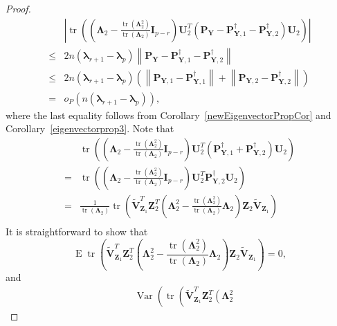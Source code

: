 \documentclass[12pt]{article} %
\DeclareMathOperator{\mytr}{tr}
\DeclareMathOperator{\myE}{E}
\DeclareMathOperator{\myVar}{Var}
\newcommand{\bZ}{\mathbf{Z}}
\newcommand{\bP}{\mathbf{P}}
\newcommand{\bY}{\mathbf{Y}}
\newcommand{\bI}{\mathbf{I}}
\newcommand{\bU}{\mathbf{U}}
\newcommand{\bV}{\mathbf{V}}
\newcommand{\bfsym}[1]{\ensuremath{\boldsymbol{#1}}}
\def\blambda {\bfsym {\lambda}}
\def\bLambda {\bfsym {\Lambda}}
\theoremstyle{definition}
\begin{document}
\begin{appendices}
\begin{proof}
\begin{equation}
           \begin{split}
    &\left|
        \mytr\left(
            \left(\bLambda_2-\frac{\mytr(\bLambda_2^2)}{\mytr(\bLambda_2)}\bI_{p-r}\right) \bU_2^T \left(\bP_{\bY}-\bP_{\bY,1}^\dagger-\bP_{\bY,2}^\dagger\right) \bU_2 
    \right)
    \right|
    \\
    \leq & 2n (\blambda_{r+1} -\blambda_p)\left\|\bP_{\bY}-\bP_{\bY,1}^\dagger-\bP_{\bY,2}^\dagger\right\|
    \\
    \leq & 2n (\blambda_{r+1} -\blambda_p)\left(
        \left\|\bP_{\bY,1}-\bP_{\bY,1}^\dagger\right\|
        +\left\|\bP_{\bY,2}-\bP_{\bY,2}^\dagger
        \right\|
    \right)
    \\
    =&o_P\left(n(\blambda_{r+1}-\blambda_p)\right),
           \end{split}
       \end{equation}
       where the last equality follows from Corollary~\ref{newEigenvectorPropCor} and Corollary~\ref{eigenvectorprop3}.
       Note that
       \begin{equation*}
           \begin{split}
        &
        \mytr\left(
            \left(\bLambda_2-\frac{\mytr(\bLambda_2^2)}{\mytr(\bLambda_2)}\bI_{p-r}\right) \bU_2^T \left(\bP_{\bY,1}^\dagger+\bP_{\bY,2}^\dagger\right) \bU_2 
    \right)
    \\
        =&
        \mytr\left(
            \left(\bLambda_2-\frac{\mytr(\bLambda_2^2)}{\mytr(\bLambda_2)}\bI_{p-r}\right) \bU_2^T \bP_{\bY,2}^\dagger \bU_2 
    \right)
    \\
    =&
    \frac{1}{\mytr(\bLambda_2)} 
    \mytr\left(\tilde{\bV}_{\bZ_1}^T \bZ_2^T 
 \left(
       \bLambda_2^2 
    -\frac{\mytr(\bLambda_2^2)}{\mytr(\bLambda_2)}\bLambda_2
 \right)
\bZ_2 \tilde{\bV}_{\bZ_1}\right)
    \\
           \end{split}
       \end{equation*}
       It is straightforward to show that
       \begin{equation*}
    \myE \mytr\left(\tilde{\bV}_{\bZ_1}^T \bZ_2^T 
 \left(
       \bLambda_2^2 
    -\frac{\mytr(\bLambda_2^2)}{\mytr(\bLambda_2)}\bLambda_2
 \right)
\bZ_2 \tilde{\bV}_{\bZ_1}\right)
=0,
       \end{equation*}
       and
       \begin{equation*}
           \begin{split}
    &\myVar\left(
        \mytr\left(\tilde{\bV}_{\bZ_1}^T \bZ_2^T 
 \left(
       \bLambda_2^2 

\end{split}
\end{equation*}
\end{proof}
\end{appendices}
\end{document}
